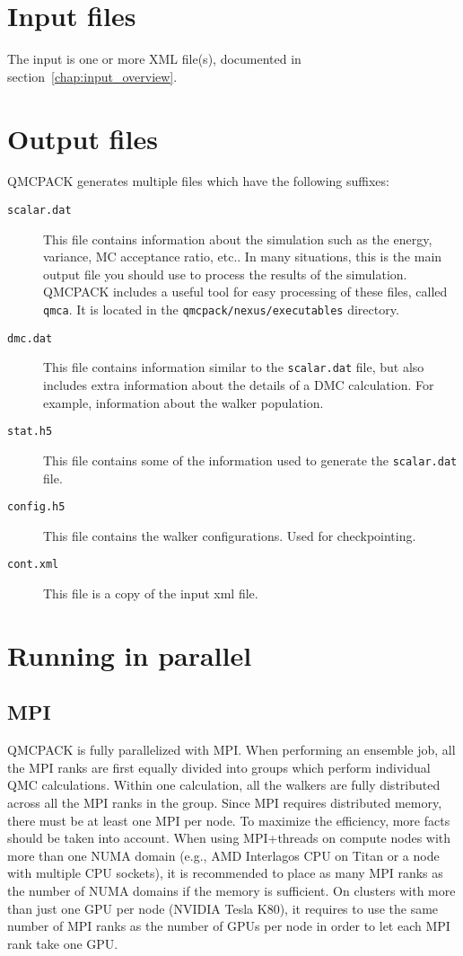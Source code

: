 \section{Input files}
\label{sec:inputs}
The input is one or more XML file(s), documented in section~\ref{chap:input_overview}.

\section{Output files}
QMCPACK generates multiple files which have the following suffixes:
\label{sec:outputs}
\begin{description}
\item[\texttt{scalar.dat}]{ This file contains information about
  the simulation such as the energy, variance, MC acceptance ratio, etc..
  In many situations, this is the main output file you should use to process
  the results of the simulation. QMCPACK includes a useful tool for easy
  processing of these files, called \texttt{qmca}. It is located in the
  \texttt{qmcpack/nexus/executables} directory.}
\item[\texttt{dmc.dat}]{ This file contains information similar to the
  \texttt{scalar.dat} file, but also includes extra information about the
  details of a DMC calculation. For example, information about the
  walker population. }
\item[\texttt{stat.h5}]{ This file contains some of the information used to
  generate the \texttt{scalar.dat} file.}
\item[\texttt{config.h5}]{ This file contains the walker configurations.
  Used for checkpointing.}
  \item[\texttt{cont.xml}]{ This file is a copy of the input xml file. }
\end{description}

\section{Running in parallel}
\label{sec:parallelrunning}


\subsection{MPI}
QMCPACK is fully parallelized with MPI. When performing an ensemble job, all
the MPI ranks are first equally divided into groups which perform individual
QMC calculations. Within one calculation, all the walkers are fully distributed
across all the MPI ranks in the group. Since MPI requires distributed memory,
there must be at least one MPI per node. To maximize the efficiency, more facts
should be taken into account. When using MPI+threads on compute nodes with more
than one NUMA domain (e.g., AMD Interlagos CPU on Titan or a node with multiple
CPU sockets), it is recommended to place as many MPI ranks as the number of
NUMA domains if the memory is sufficient. On clusters with more than just one
GPU per node (NVIDIA Tesla K80), it requires to use the same number of MPI
ranks as the number of GPUs per node in order to let each MPI rank take one GPU.

